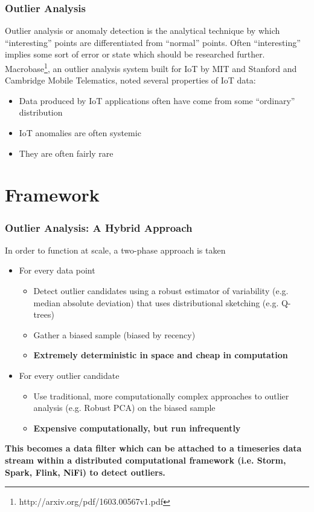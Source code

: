 \documentclass[aspectratio=169]{beamer}
\begin{document}
\begin{frame}
\frametitle{Outlier Analysis}
Outlier analysis or anomaly detection is the analytical technique by which ``interesting'' points are differentiated from ``normal'' points.  Often ``interesting'' implies some sort of error or state which should be researched further.\pause
\\
Macrobase\footnote{http://arxiv.org/pdf/1603.00567v1.pdf}, an outlier analysis system built for IoT by MIT and Stanford and Cambridge Mobile Telematics, noted several properties of IoT data:
\begin{itemize}
\item Data produced by IoT applications often have come from some ``ordinary'' distribution
\item IoT anomalies are often systemic
\item They are often fairly rare
\end{itemize}
\end{frame}

\section{Framework}

\begin{frame}
\frametitle{Outlier Analysis: A Hybrid Approach}
In order to function at scale, a two-phase approach is taken
\begin{itemize}
\item For every data point\pause
  \begin{itemize}
  \item Detect outlier candidates using a robust estimator of variability (e.g. median absolute deviation) that uses distributional sketching (e.g. Q-trees)
  \item Gather a biased sample (biased by recency)\pause
  \item {\bf Extremely deterministic in space and cheap in computation}\pause
  \end{itemize}
\item For every outlier candidate
  \begin{itemize}
  \item Use traditional, more computationally complex approaches to outlier analysis (e.g. Robust PCA) on the biased sample\pause
  \item {\bf Expensive computationally, but run infrequently}\pause
  \end{itemize}
\end{itemize}
{\bf This becomes a data filter which can be attached to a timeseries 
data stream within a distributed computational framework (i.e. Storm, Spark, Flink, NiFi) to detect outliers.}
\end{frame}
\end{document}
